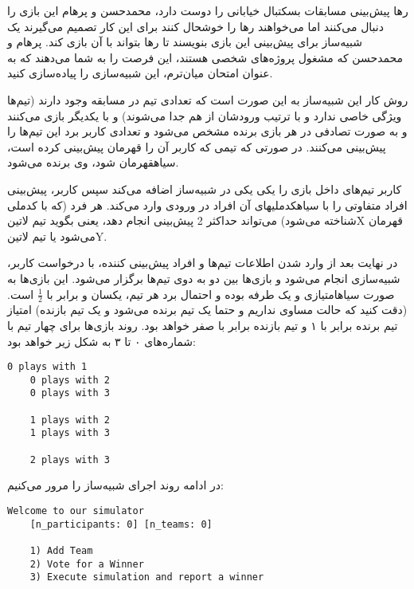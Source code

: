 \documentclass[../main.tex]{subfiles}
\begin{document}


رها پیش‌بینی مسابقات بسکتبال خیابانی را دوست دارد، محمدحسن و پرهام این بازی را دنبال می‌کنند اما می‌خواهند رها را خوشحال کنند
برای این کار تصمیم می‌گیرند یک شبیه‌ساز برای پیش‌بینی‌ این بازی بنویسند تا رها بتواند با آن بازی کند.
پرهام و محمدحسن که مشغول پروژه‌های شخصی هستند، این فرصت را به شما می‌دهند که به عنوان امتحان میان‌ترم، این شبیه‌سازی را پیاده‌سازی کنید.


روش کار این شبیه‌ساز به این صورت است که تعدادی تیم در مسابقه وجود دارند (تیم‌ها ویژگی خاصی ندارد و با ترتیب ورودشان از هم جدا می‌شوند)
و با یکدیگر بازی می‌کنند و به صورت تصادفی در هر بازی برنده مشخص می‌شود و تعدادی کاربر برد این تیم‌ها را پیش‌بینی می‌کنند.
در صورتی که تیمی که کاربر آن را قهرمان پیش‌بینی کرده است، ‌سیاه{قهرمان} شود، وی برنده می‌شود.

کاربر تیم‌های داخل بازی را یکی یکی در شبیه‌ساز اضافه می‌کند
سپس کاربر، پیش‌بینی افراد متفاوتی را با ‌سیاه{کدملی}های آن افراد در ورودی وارد می‌کند.
هر فرد (که با کدملی شناخته می‌شود) می‌تواند حداکثر 2 پیش‌بینی انجام دهد،
یعنی بگوید تیم ‌لاتین{X} قهرمان می‌شود یا تیم ‌لاتین{Y}.

در نهایت بعد از وارد شدن اطلاعات تیم‌ها و افراد پیش‌بینی کننده، با درخواست کاربر، شبیه‌سازی انجام می‌شود و
بازی‌ها بین دو به دوی تیم‌ها برگزار می‌شود.
این بازی‌ها به صورت
‌سیاه{امتیازی و یک طرفه}
بوده و احتمال برد هر تیم‌، یکسان و برابر با
\(\frac{1}{2}\)
است. 
(دقت کنید که حالت مساوی نداریم و حتما یک تیم برنده می‌شود و یک تیم بازنده)
امتیاز تیم برنده برابر با ۱ و تیم بازنده برابر با صفر خواهد بود.
روند بازی‌ها برای چهار تیم با شماره‌های ۰ تا ۳ به شکل زیر خواهد بود:

\begin{latin}
\begin{lstlisting}[]
    0 plays with 1
    0 plays with 2
    0 plays with 3

    1 plays with 2
    1 plays with 3

    2 plays with 3
\end{lstlisting}
\end{latin}


در ادامه روند اجرای شبیه‌ساز را مرور می‌کنیم:

\begin{latin}
\begin{lstlisting}[]
    Welcome to our simulator
    [n_participants: 0] [n_teams: 0]

    1) Add Team
    2) Vote for a Winner
    3) Execute simulation and report a winner
\end{lstlisting}
\end{latin}
\end{document}

